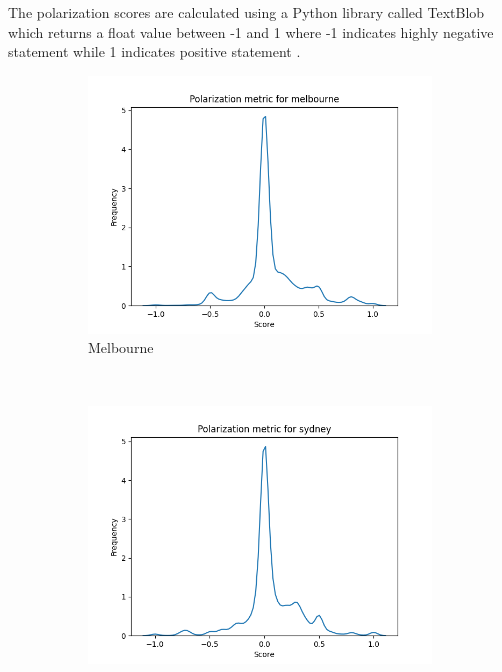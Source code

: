 \documentclass[11pt, oneside]{article}
\begin{document}
\newline
The polarization scores are calculated using a Python library called TextBlob which returns a float value between -1 and 1 where -1 indicates highly negative statement while 1 indicates positive statement .
\begin{figure}[h!]
    \centering
    \begin{subfigure}[b]{0.3\textwidth}
        \includegraphics[width=\textwidth]{figures/polarization_melbourne.png}
        \caption{Melbourne}
    \end{subfigure}
    ~ %
    \begin{subfigure}[b]{0.3\textwidth}
        \includegraphics[width=\textwidth]{figures/polarization_sydney.png}

\end{subfigure}
\end{figure}
\end{document}
